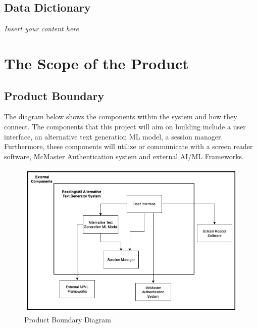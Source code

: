 \documentclass[12pt]{article}
\newcommand{\lips}{\textit{Insert your content here.}}
\begin{document}
\subsection{Data Dictionary}
\lips

\section{The Scope of the Product}
\subsection{Product Boundary}
The diagram below shows the components within the system and how they connect. The components that this project will aim on building include a user interface, an alternative text generation ML model, a session manager. Furthermore, these components will utilize or communicate with a screen reader software, McMaster Authentication system and external AI/ML Frameworks. 
 \begin{figure}[H]
    \centering
    \includegraphics[width=1.0\textwidth]{Product_Boundary_Diagram.jpg}
    \caption{Product Boundary Diagram}
    \label{img:usecase}
\end{figure}
\end{document}
